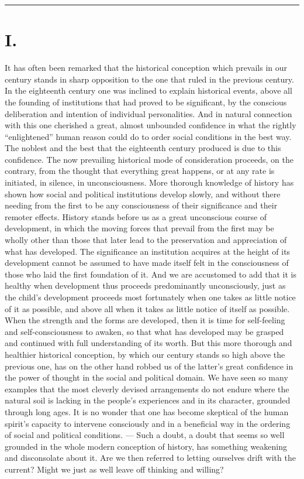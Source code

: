 \documentclass[12pt,a4paper,openany]{book}
\newcommand{\opage}[1]{\marginnote{\footnotesize\textit{[#1]}}}
\newcommand{\streg}{\begin{center}\rule{3em}{0.4pt}\end{center}}
\begin{document}
\streg{}

\section*{I.}

It has often been remarked that the historical conception
which prevails in our century stands in sharp opposition to
the one that ruled in the previous century. In the eighteenth
century one was inclined to explain historical events, above all the
founding of institutions that had proved to be significant, by the conscious
deliberation and intention of individual personalities. And in natural connection
with this one cherished a great, almost unbounded confidence in
what the rightly ``enlightened'' human reason could do
to order social conditions in the best way. The noblest
and the best that the eighteenth century produced is due to
this confidence. The now prevailing historical mode of consideration
proceeds, on the contrary, from the thought that everything great happens, or at
any rate is initiated, in silence, in unconsciousness. More thorough
knowledge of history has shown how social and political
institutions develop slowly, and without there needing from the first
to be any consciousness of their significance
and their remoter effects. History stands before us as
a great unconscious course of development, in which the moving
forces that prevail from the first may be wholly other than
those that later lead to the preservation and appreciation of what
has developed. The significance an institution acquires at
the height of its development cannot be assumed to have
made itself felt in the consciousness of those who laid the first
foundation of it. And we are accustomed to add that it is healthy when
development thus proceeds predominantly unconsciously, just
\opage{114}as the child's development proceeds most fortunately when one takes as
little notice of it as possible, and above all when it
takes as little notice of itself as possible. When the strength
and the forms are developed, then it is time for self-feeling and
self-consciousness to awaken, so that what has developed may be grasped and
continued with full understanding of its worth. But this
more thorough and healthier historical conception, by which our
century stands so high above the previous one, has on the other hand
robbed us of the latter's great confidence in the power of thought in the social
and political domain. We have seen so many examples that
the most cleverly devised arrangements do not endure where the
natural soil is lacking in the people's experiences and in its character, grounded
through long ages. It is no
wonder that one has become skeptical of the human
spirit's capacity to intervene consciously and in a beneficial
way in the ordering of social and political conditions. --- Such
a doubt, a doubt that seems so well grounded in the whole
modern conception of history, has something weakening and
disconsolate about it. Are we then referred to letting ourselves drift
with the current? Might we just as well leave off thinking
and willing?
\end{document}
